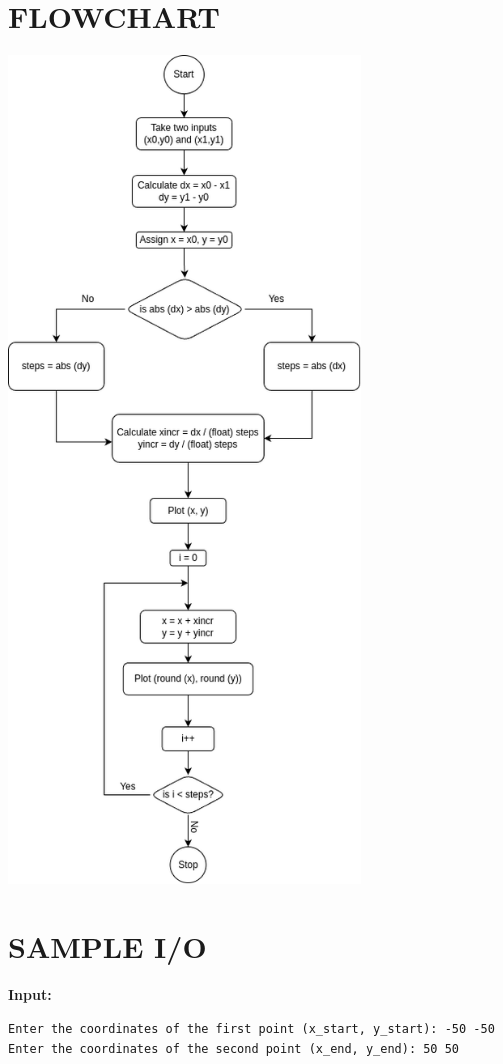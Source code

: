 \documentclass{article}
\begin{document}
\section*{FLOWCHART}
\begin{center}
\includegraphics[width=0.7\textwidth]{flowchart.png}
\end{center}

\section*{SAMPLE I/O}
\textbf{Input:}
\begin{verbatim}
Enter the coordinates of the first point (x_start, y_start): -50 -50
Enter the coordinates of the second point (x_end, y_end): 50 50
\end{verbatim}
\end{document}
